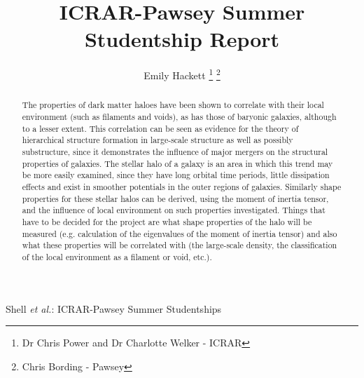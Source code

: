 \documentclass[journal]{IEEEtran}
\begin{document}
\title{ICRAR-Pawsey Summer Studentship Report}

\author{Emily Hackett%
\thanks{Dr Chris Power and Dr Charlotte Welker - ICRAR}
\thanks{Chris Bording - Pawsey}}

%
{Shell \MakeLowercase{\textit{et al.}}: ICRAR-Pawsey Summer Studentships}

\maketitle

\begin{abstract}
The properties of dark matter haloes have been shown to correlate with their local environment (such as filaments and voids), as has those of baryonic galaxies, although to a lesser extent. This correlation can be seen as evidence for the theory of hierarchical structure formation in large-scale structure as well as possibly substructure, since it demonstrates the influence of major mergers on the structural properties of galaxies. The stellar halo of a galaxy is an area in which this trend may be more easily examined, since they have long orbital time periods, little dissipation effects and exist in smoother potentials in the outer regions of galaxies. Similarly shape properties for these stellar halos can be derived, using the moment of inertia tensor, and the influence of local environment on such properties investigated.
Things that have to be decided for the project are what shape properties of the halo will be measured (e.g. calculation of the eigenvalues of the moment of inertia tensor) and also what these properties will be correlated with (the large-scale density, the classification of the local environment as a filament or void, etc.).
\end{abstract}

\IEEEpeerreviewmaketitle

\end{document}
